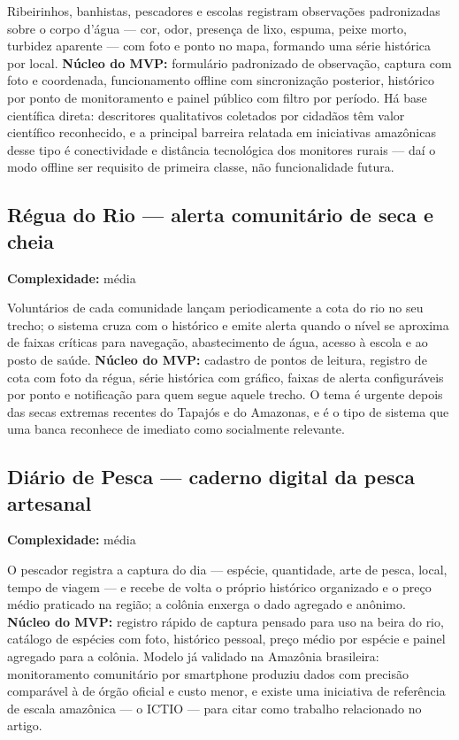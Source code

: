 \documentclass[11pt,a4paper]{article}
\newcommand{\complex}[1]{{\small\color{cinza}\textbf{Complexidade:} #1}}
\begin{document}
Ribeirinhos, banhistas, pescadores e escolas registram observações padronizadas sobre o corpo
d'água --- cor, odor, presença de lixo, espuma, peixe morto, turbidez aparente --- com foto e ponto
no mapa, formando uma série histórica por local. \textbf{Núcleo do MVP:} formulário padronizado de
observação, captura com foto e coordenada, funcionamento offline com sincronização posterior,
histórico por ponto de monitoramento e painel público com filtro por período. Há base científica
direta: descritores qualitativos coletados por cidadãos têm valor científico reconhecido, e a
principal barreira relatada em iniciativas amazônicas desse tipo é conectividade e distância
tecnológica dos monitores rurais --- daí o modo offline ser requisito de primeira classe, não
funcionalidade futura.

\subsection{Régua do Rio --- alerta comunitário de seca e cheia}
\complex{média}

Voluntários de cada comunidade lançam periodicamente a cota do rio no seu trecho; o sistema cruza
com o histórico e emite alerta quando o nível se aproxima de faixas críticas para navegação,
abastecimento de água, acesso à escola e ao posto de saúde. \textbf{Núcleo do MVP:} cadastro de
pontos de leitura, registro de cota com foto da régua, série histórica com gráfico, faixas de alerta
configuráveis por ponto e notificação para quem segue aquele trecho. O tema é urgente depois das
secas extremas recentes do Tapajós e do Amazonas, e é o tipo de sistema que uma banca reconhece de
imediato como socialmente relevante.

\subsection{Diário de Pesca --- caderno digital da pesca artesanal}
\complex{média}

O pescador registra a captura do dia --- espécie, quantidade, arte de pesca, local, tempo de viagem
--- e recebe de volta o próprio histórico organizado e o preço médio praticado na região; a colônia
enxerga o dado agregado e anônimo. \textbf{Núcleo do MVP:} registro rápido de captura pensado para
uso na beira do rio, catálogo de espécies com foto, histórico pessoal, preço médio por espécie e
painel agregado para a colônia. Modelo já validado na Amazônia brasileira: monitoramento comunitário
por smartphone produziu dados com precisão comparável à de órgão oficial e custo menor, e existe
uma iniciativa de referência de escala amazônica --- o ICTIO --- para citar como trabalho
relacionado no artigo.
\end{document}
